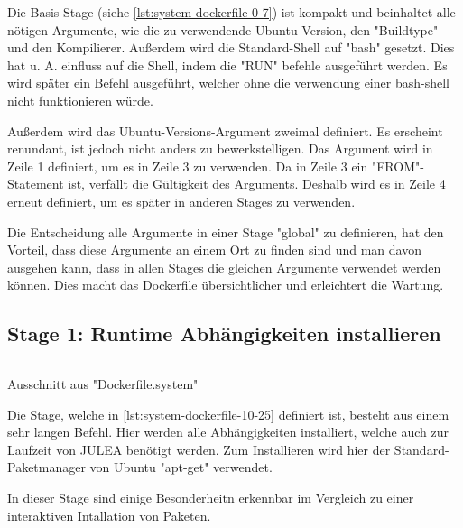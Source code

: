 Die Basis-Stage (siehe \cref{lst:system-dockerfile-0-7}) ist kompakt und beinhaltet alle nötigen Argumente, wie die zu verwendende Ubuntu-Version, den "Buildtype" und den Kompilierer. Außerdem wird die Standard-Shell auf "bash" gesetzt. Dies hat u. A. einfluss auf die Shell, indem die "RUN" befehle ausgeführt werden. Es wird später ein Befehl ausgeführt, welcher ohne die verwendung einer bash-shell nicht funktionieren würde.

Außerdem wird das Ubuntu-Versions-Argument zweimal definiert. Es erscheint renundant, ist jedoch nicht anders zu bewerkstelligen. Das Argument wird in Zeile 1 definiert, um es in Zeile 3 zu verwenden. Da in Zeile 3 ein "FROM"-Statement ist, verfällt die Gültigkeit des Arguments. Deshalb wird es in Zeile 4 erneut definiert, um es später in anderen Stages zu verwenden. 

Die Entscheidung alle Argumente in einer Stage "global" zu definieren, hat den Vorteil, dass diese Argumente an einem Ort zu finden sind und man davon ausgehen kann, dass in allen Stages die gleichen Argumente verwendet werden können. Dies macht das Dockerfile übersichtlicher und erleichtert die Wartung. 

\subsection{Stage 1: Runtime Abhängigkeiten installieren} \label{sec:system-stage-1}

\begin{listing}[H]
    \inputminted[firstline=10,lastline=25]{dockerfile}{./code-examples/Dockerfile.system}
    \caption{Ausschnitt aus "Dockerfile.system"}
    \label{lst:system-dockerfile-10-25}
\end{listing}

Die Stage, welche in \cref{lst:system-dockerfile-10-25} definiert ist, besteht aus einem sehr langen Befehl. Hier werden alle Abhängigkeiten installiert, welche auch zur Laufzeit von JULEA benötigt werden. Zum Installieren wird hier der Standard-Paketmanager von Ubuntu "apt-get" verwendet. 

In dieser Stage sind einige Besonderheitn erkennbar im Vergleich zu einer interaktiven Intallation von Paketen. 

